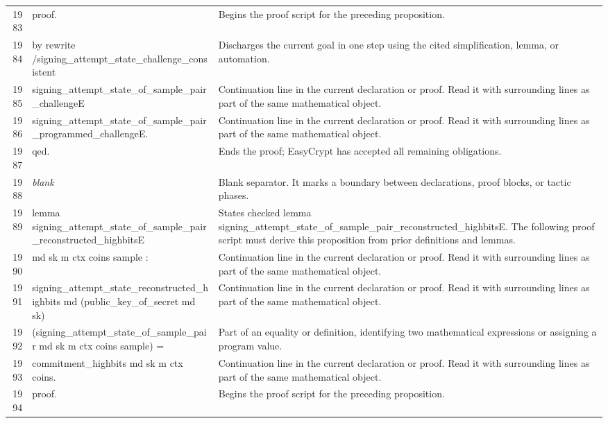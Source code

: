 \documentclass[10pt]{article}
\begin{document}
\begin{longtable}{r L{0.53\textwidth} L{0.37\textwidth}}
1983 & {\ttfamily\scriptsize proof.} & Begins the proof script for the preceding proposition. \\
1984 & {\ttfamily\scriptsize by rewrite /signing\_attempt\_state\_challenge\_consistent} & Discharges the current goal in one step using the cited simplification, lemma, or automation. \\
1985 & {\ttfamily\scriptsize            signing\_attempt\_state\_of\_sample\_pair\_challengeE} & Continuation line in the current declaration or proof.  Read it with surrounding lines as part of the same mathematical object. \\
1986 & {\ttfamily\scriptsize            signing\_attempt\_state\_of\_sample\_pair\_programmed\_challengeE.} & Continuation line in the current declaration or proof.  Read it with surrounding lines as part of the same mathematical object. \\
1987 & {\ttfamily\scriptsize qed.} & Ends the proof; EasyCrypt has accepted all remaining obligations. \\
1988 & {\ttfamily\scriptsize \emph{blank}} & Blank separator.  It marks a boundary between declarations, proof blocks, or tactic phases. \\
1989 & {\ttfamily\scriptsize lemma signing\_attempt\_state\_of\_sample\_pair\_reconstructed\_highbitsE} & States checked lemma signing\_attempt\_state\_of\_sample\_pair\_reconstructed\_highbitsE.  The following proof script must derive this proposition from prior definitions and lemmas. \\
1990 & {\ttfamily\scriptsize    md sk m ctx coins sample :} & Continuation line in the current declaration or proof.  Read it with surrounding lines as part of the same mathematical object. \\
1991 & {\ttfamily\scriptsize   signing\_attempt\_state\_reconstructed\_highbits md (public\_key\_of\_secret md sk)} & Continuation line in the current declaration or proof.  Read it with surrounding lines as part of the same mathematical object. \\
1992 & {\ttfamily\scriptsize     (signing\_attempt\_state\_of\_sample\_pair md sk m ctx coins sample) =} & Part of an equality or definition, identifying two mathematical expressions or assigning a program value. \\
1993 & {\ttfamily\scriptsize   commitment\_highbits md sk m ctx coins.} & Continuation line in the current declaration or proof.  Read it with surrounding lines as part of the same mathematical object. \\
1994 & {\ttfamily\scriptsize proof.} & Begins the proof script for the preceding proposition. \\

\end{longtable}
\end{document}
